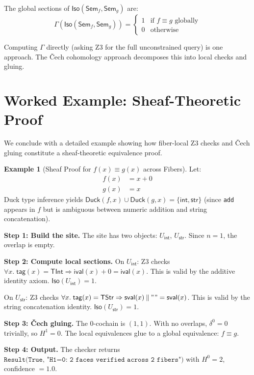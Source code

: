 \documentclass[11pt,a4paper]{report}
\theoremstyle{definition}
\newtheorem{example}[definition]{Example}
\theoremstyle{plain}
\newcommand{\Sem}{\mathsf{Sem}}
\newcommand{\Iso}{\mathsf{Iso}}
\begin{document}
The global sections of $\Iso(\Sem_f, \Sem_g)$ are:
\[
  \Gamma(\Iso(\Sem_f, \Sem_g)) = \begin{cases}
    1 & \text{if $f \equiv g$ globally} \\
    0 & \text{otherwise}
  \end{cases}
\]

Computing $\Gamma$ directly (asking Z3 for the full unconstrained
query) is one approach.  The \v{C}ech cohomology approach decomposes
this into local checks and gluing.

\section{Worked Example: Sheaf-Theoretic Proof}

We conclude with a detailed example showing how fiber-local Z3 checks
and \v{C}ech gluing constitute a sheaf-theoretic equivalence proof.

\begin{example}[Sheaf Proof for $f(x) \equiv g(x)$ across Fibers]
\label{ex:sheaf-proof}
Let:
\begin{align}
  f(x) &= x + 0 \\
  g(x) &= x
\end{align}
Duck type inference yields
$\mathsf{Duck}(f, x) \cup \mathsf{Duck}(g, x) =
\{\mathsf{int}, \mathsf{str}\}$ (since \texttt{add} appears in $f$
but is ambiguous between numeric addition and string concatenation).

\medskip\noindent
\textbf{Step 1: Build the site.}
The site has two objects: $U_\mathsf{int}$, $U_\mathsf{str}$.
Since $n=1$, the overlap is empty.

\medskip\noindent
\textbf{Step 2: Compute local sections.}
On $U_\mathsf{int}$: Z3 checks
$\forall x.\; \mathsf{tag}(x) = \mathsf{TInt} \Rightarrow
\mathsf{ival}(x) + 0 = \mathsf{ival}(x)$.
This is valid by the additive identity axiom.
$\Iso(U_\mathsf{int}) = 1$.

On $U_\mathsf{str}$: Z3 checks
$\forall x.\; \mathsf{tag}(x) = \mathsf{TStr} \Rightarrow
\mathsf{sval}(x) \mathbin{\|} \mathtt{""} = \mathsf{sval}(x)$.
This is valid by the string concatenation identity.
$\Iso(U_\mathsf{str}) = 1$.

\medskip\noindent
\textbf{Step 3: \v{C}ech gluing.}
The 0-cochain is $(1, 1)$.
With no overlaps, $\delta^0 = 0$ trivially, so $H^1 = 0$.
The local equivalences glue to a global equivalence: $f \equiv g$.

\medskip\noindent
\textbf{Step 4: Output.}
The checker returns
$\texttt{Result(True, "H1=0: 2 faces verified across 2 fibers")}$
with $H^0 = 2$, confidence $= 1.0$.
\end{example}
\end{document}
